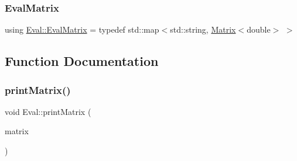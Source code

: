 \subsubsection{\texorpdfstring{Eval\+Matrix}{EvalMatrix}}
{\footnotesize\ttfamily using \hyperlink{namespace_eval_a565709ccceb6f242086a1bab22551525}{Eval\+::\+Eval\+Matrix} = typedef std\+::map$<$std\+::string, \hyperlink{_matrix_8h_a30e4daca1ceec5f93cf2a1214d8dd3c9}{Matrix}$<$double$>$ $>$}



\subsection{Function Documentation}
\mbox{\label{namespace_eval_aae52ed3d7a67d74c6ffc3f4faa546c3d}} 
\subsubsection{\texorpdfstring{print\+Matrix()}{printMatrix()}}
{\footnotesize\ttfamily void Eval\+::print\+Matrix (\begin{DoxyParamCaption}\item[{\hyperlink{namespace_eval_a565709ccceb6f242086a1bab22551525}{Eval\+::\+Eval\+Matrix}}]{matrix }\end{DoxyParamCaption})}

